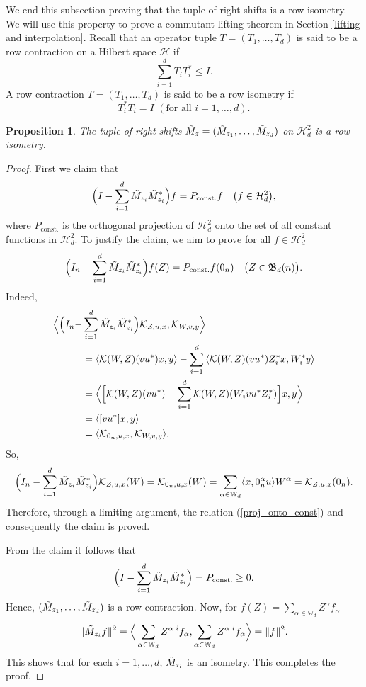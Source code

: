 \documentclass[12pt]{amsart}%
\newtheorem{proposition}[theorem]{Proposition}
\numberwithin{equation}{section}
\newcommand{\bW}{\mathbb{W}}
\newcommand{\fB}{{\mathfrak{B}}}
\newcommand{\clh}{\mathcal{H}}
\newcommand{\clk}{\mathcal{K}}
\newcommand\la{{\langle }}
\newcommand\ra{{\rangle}}
\begin{document}
We end this subsection proving that the tuple of right shifts is a row isometry. We will use this property to prove a commutant lifting theorem in Section \ref{lifting and interpolation}.
Recall that an operator tuple $T=(T_1,\ldots,T_d)$ is said to be a row contraction on a Hilbert space $\clh$ if 
\[
\sum_{i=1}^d T_iT_i^*\leq I.
\]
A row contraction $T=(T_1,\ldots,T_d)$ is said to be a row isometry if
\[
T_i^*T_i=I\,\,(\text{for all}\,\, i=1,\ldots,d).
\]
\begin{proposition}\label{right_shift_row}
The tuple of right shifts $\Tilde{M}_z=(\tilde{M}_{z_1},\ldots,\Tilde{M}_{z_d})$ on $\clh^2_d$ is a row isometry. 
\end{proposition}
\begin{proof}
First we claim that 
\[
\Big(I-\sum_{i=1}^d\Tilde{M}_{z_i}\Tilde{M}_{z_i}^*\Big)f=P_{\text{const.}}f\quad\big(f\in\clh^2_d\big),
\]
where $P_{\text{const.}}$ is the orthogonal projection of $\clh^2_d$ onto the set of all constant functions in $\clh^2_d$. To justify the claim, we aim to prove for all $f\in\clh^2_d$
\begin{equation}\label{proj_onto_const}
\Big(I_n-\sum_{i=1}^d\Tilde{M}_{z_i}\Tilde{M}_{z_i}^*\Big)f(Z)=P_{\text{const.}}f(0_n)\quad\big( Z\in\fB_d(n)\big).
\end{equation}
Indeed,
\begingroup
 \allowdisplaybreaks
\begin{align*}
\Big\langle \Big(I_n-&\sum_{i=1}^d\Tilde{M}_{z_i}\Tilde{M}_{z_i}^*\Big)\clk_{Z,u,x},\clk_{W,v,y}\Big\rangle\\
&=\la\clk(W,Z)(vu^*)x,y\ra-\sum_{i=1}^d\la\clk(W,Z)(vu^*)Z_i^*x,W_i^*y\ra\\
&=\Big\langle\Big[\clk(W,Z)(vu^*)-\sum_{i=1}^d \clk(W,Z)(W_ivu^*Z_i^*)\Big]x,y\Big\rangle\\
&=\la[vu^*]x,y\ra\\
&=\la\clk_{0_n,u,x},\clk_{W,v,y}\ra. 
\end{align*}
\endgroup
So,
\[
\Big(I_n-\sum_{i=1}^d \Tilde{M}_{z_i}\Tilde{M}_{z_i}^*\Big)\clk_{Z,u,x}(W)=\clk_{0_n,u,x}(W)=\sum_{\alpha\in\bW_d}\langle x,0_n^{\alpha} u\rangle W^{\alpha}=\clk_{Z,u,x}(0_n).
\]
Therefore, through a limiting argument, the relation (\ref{proj_onto_const}) and consequently the claim is proved. 

From the claim it follows that
\[
\Big(I-\sum_{i=1}^d\Tilde{M}_{z_i}\Tilde{M}_{z_i}^*\Big)=P_{\text{const.}}\geq 0.
\]
Hence, $(\Tilde{M}_{z_1},\ldots,\Tilde{M}_{z_d})$ is a row contraction. 
Now, for $f(Z)=\sum_{\alpha\in\bW_d}Z^{\alpha}f_{\alpha}$
\[
\|\Tilde{M}_{z_i}f\|^2=\Big\langle \sum_{\alpha\in\bW_d}Z^{\alpha.i}f_{\alpha},\sum_{\alpha\in\bW_d}Z^{\alpha.i}f_{\alpha}\Big\rangle=\|f\|^2.
\]
This shows that for each $i=1,\ldots, d$, $\Tilde{M}_{z_i}$ is an isometry. This completes the proof.
\end{proof}
\end{document}
